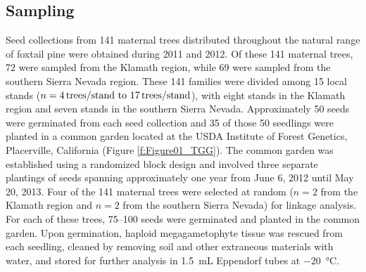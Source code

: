 \documentclass[11pt]{article}
\begin{document}
\subsection*{Sampling}
Seed collections from 141 maternal trees distributed throughout the natural range 
of foxtail pine were obtained during 2011 and 2012. Of these 141 maternal trees, 72 were sampled from the 
Klamath region, while 69 were sampled from the southern Sierra Nevada region. These 141 families were
divided among 15 local stands ($n = \text{\SIrange{4}{17}{trees/stand}}$), with eight stands in the Klamath region and seven 
stands in the southern Sierra Nevada.
Approximately 50 seeds were germinated from each seed collection and 35 of those 50 seedlings were planted in a 
common garden located at the USDA Institute of Forest Genetics, Placerville, California (Figure \ref{f:Figure01_TGG}). The 
common garden was established using a randomized block design and involved three separate plantings of seeds spanning
approximately one year from June 6, 2012 until May 20, 2013. Four of the 141 maternal trees were selected 
at random ($n = 2$ from the Klamath region and $n = 2$ from the southern Sierra Nevada) for linkage analysis. 
For each of these trees, \SIrange{75}{100}{} seeds were germinated and planted in the common garden. 
Upon germination, haploid megagametophyte tissue was rescued from each seedling, cleaned by removing 
soil and other extraneous materials with water, and stored for further 
analysis in \SI{1.5}{\mL} Eppendorf tubes at \SI{-20}{\celsius}.
\end{document}
